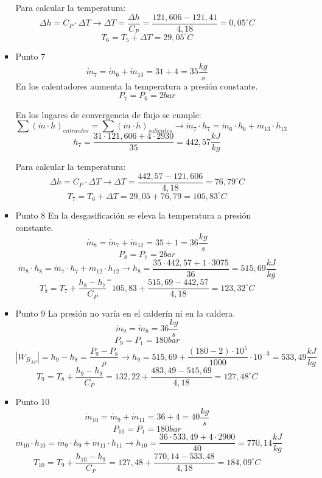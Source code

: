 \begin{enumerate}
\begin{enumerate}
\begin{itemize}
			
			Para calcular la temperatura:
			\[\Delta h=C_P\cdot\Delta T\rightarrow \Delta T=\frac{\Delta h}{C_P}=\frac{121,606-121,41}{4,18}=0,05^\circ C\]
			\[T_6=T_5+\Delta T=29,05^\circ C\]
			\item Punto 7
			\[\dot{m}_7= \dot{m}_6+\dot{m}_13=31+4=35\frac{kg}{s}\]
			En los calentadores aumenta la temperatura a presión constante.
			\[P_7=P_6=2bar\]
			
			
			En los lugares de convergencia de flujo se cumple:
			\[\sum\left(\dot{m}\cdot h\right)_{entrantes}=\sum\left(\dot{m}\cdot h\right)_{salientes}\rightarrow \dot{m}_7\cdot h_7=\dot{m}_6\cdot h_6+\dot{m}_{13}\cdot h_{13}\]
			\[h_7=\frac{31\cdot121,606+4\cdot2930}{35}=442,57\frac{kJ}{kg}\]
			
			Para calcular la temperatura:
			\[\Delta h=C_P\cdot \Delta T\rightarrow \Delta T=\frac{442,57-121,606}{4,18}=76,79^\circ C\]
			\[T_7=T_6+\Delta T=29,05+76,79=105,83^\circ C\]
			\item Punto 8 \newline
			En la desgasificación se eleva la temperatura a presión constante.
			\[\dot{m}_8=\dot{m}_7+\dot{m}_{12}=35+1=36\frac{kg}{s}\]
			\[P_8=P_7=2bar\]
			\[\dot{m}_8\cdot h_8=\dot{m}_7\cdot h_7+\dot{m}_{12}\cdot h_{12}\rightarrow h_8=\frac{35\cdot442,57+1\cdot3075}{36}=515,69\frac{kJ}{kg}\]
			\[T_8=T_7+\frac{h_8-h_7}{C_P}^=105,83+\frac{515,69-442,57}{4,18}=123,32^\circ C\]
			
			\item Punto 9 \newline
			La presión no varía en el calderín ni en la caldera.
			\[\dot{m}_9=\dot{m}_8=36\frac{kg}{s}\]
			\[P_9=P_1=180bar\]
			\[|W_{B_{AP}}|=h_9-h_8=\frac{P_9-P_8}{\rho}\rightarrow h_9=515,69+\frac{(180-2)\cdot 10^5}{1000}\cdot 10^{-3}=533,49\frac{kJ}{kg}\]
			\[T_9=T_8+\frac{h_9-h_8}{C_P}=132,22+\frac{483,49-515,69}{4,18}=127,48^\circ C\]
			\item Punto 10 \newline
			\[\dot{m}_{10}=\dot{m}_{9}+\dot{m}_{11}=36+4=40\frac{kg}{s}\]
			\[P_{10}=P_1=180bar\]
			\[\dot{m}_{10}\cdot h_{10}=\dot{m}_{9}\cdot h_{9}+\dot{m}_{11}\cdot h_{11}\rightarrow h_{10}=\frac{36\cdot533,49+4\cdot2900}{40}=770,14\frac{kJ}{kg}\]
			\[T_{10}=T_9+\frac{h_{10}-h_9}{C_P}=127,48+\frac{770,14-533,48}{4,18}=184,09^\circ C\]
			

\end{itemize}
\end{enumerate}
\end{enumerate}
